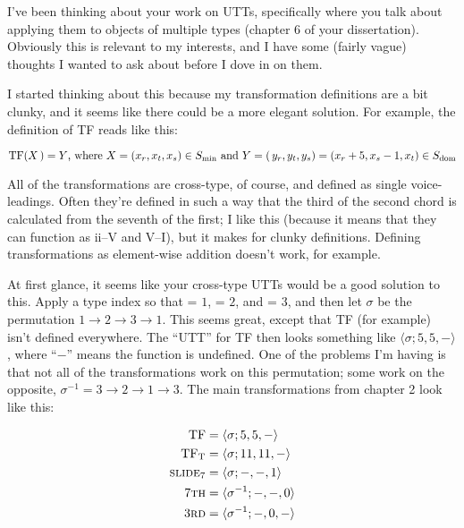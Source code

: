 \documentclass[12pt]{article}
\newcommand{\blank}{\vspace{1em}}
\begin{document}
\singlespacing
\pagestyle{empty}

I've been thinking about your work on UTTs, specifically where you talk about
applying them to objects of multiple types (chapter 6 of your dissertation).
Obviously this is relevant to my interests, and I have some (fairly vague)
thoughts I wanted to ask about before I dove in on them.


I started thinking about this because my transformation definitions are a bit
clunky, and it seems like there could be a more elegant solution. For example,
the definition of TF reads like this:

\blank
    $\mathrm{TF}(X\,) = Y\text{, where}\ X = (x_r, x_t, x_s) \in S_{\mathrm{min}}
    \text{ and}\
    Y = (\,y_r, y_t, y_s) = (x_r + 5, x_s - 1, x_t) \in S_{\mathrm{dom}}$
\blank

\noindent All of the transformations are cross-type, of course, and
defined as single voice-leadings. Often they're defined in such a way that
the third of the second chord is calculated from the seventh of the first;
I like this (because it means that they can function as ii--V and V--I),
but it makes for clunky definitions. Defining transformations as
element-wise addition doesn't work, for example.

\blank

At first glance, it seems like your cross-type UTTs would be a good solution
to this. Apply a type index so that \Smin = $1$, \Sdom = $2$, and \Smaj = $3$,
and then let $\sigma$ be the permutation
$1 \rightarrow 2 \rightarrow 3 \rightarrow 1$. This seems great, except that
TF (for example) isn't defined everywhere. The ``UTT'' for TF then looks
something like $\langle \sigma; 5, 5, -\rangle$, where ``$-$'' means the function
is undefined. One of the problems I'm having is that not all of the
transformations work on this permutation; some work on the opposite,
$\sigma^{-1} = 3 \rightarrow 2 \rightarrow 1 \rightarrow 3$. The main
transformations from chapter 2 look like this:

\begin{align*}
    \text{TF}   &= \langle \sigma; 5, 5, - \rangle \\
    \text{TF}_\mathrm{T} &= \langle \sigma; 11, 11, - \rangle \\
    \text{\textsc{slide}}_7 &= \langle \sigma; -, -, 1 \rangle \\
    \text{7\textsc{th}} &= \langle \sigma^{-1}; -, -, 0 \rangle \\
    \text{3\textsc{rd}} &= \langle \sigma^{-1}; -, 0, - \rangle \\
\end{align*}
\end{document}
